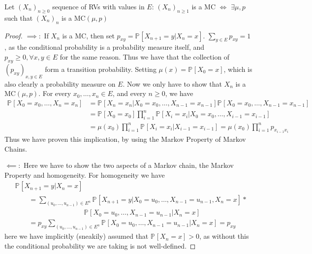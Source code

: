 \begin{prop}
	Let $(X_n)_{n \geq 0}$ sequence of RVs with values in $E$:
	$(X_n)_{n \geq 1}$ is a MC $\iff$ $\exists \mu, p$ such that $(X_n)_n$ is a MC$(\mu, p)$
\end{prop}
\begin{proof}
	$\implies:$ If $X_n$ is a MC, then set $p_{xy}=\mathbb{P}_{} \left[ X_{n+1}=y | X_{n}=x \right] $. $\sum_{y \in E}^{} p_{xy}=1$, as the conditional probability is a probability measure itself, and $p_{xy}\geq 0, \forall x, y \in E$ for the same reason. Thus we have that the collection of $(p_{xy})_{x,y \in E}$ form a transition probability. Setting $\mu(x) = \mathbb{P}_{} \left[ X_0 =x \right] $, which is also clearly a probability measure on $E$. Now we only have to show that $X_{n} $ is a $ \textrm{MC}(\mu, p)$. For every $x_0,\ldots , x_n \in E$, and every $n\geq 0$, we have
\begin{align}
	\mathbb{P}_{} \left[ X_0=x_0, \ldots ,X_n=x_n \right]  
	&= \mathbb{P}_{} \left[ X_n = x_n | X_0=x_0 , \ldots , X_{n-1}=x_{n-1} \right] \mathbb{P}_{} \left[ X_0=x_0 , \ldots , X_{n-1}=x_{n-1} \right] \\
	&= \mathbb{P}_{} \left[ X_0 = x_0 \right] \prod_{i=1}^{n} \mathbb{P}_{} \left[ X_i = x_i | X_0=x_0, \ldots , X_{i-1}=x_{i-1} \right] \\
	&= \mu(x_0) \prod_{i=1}^n \mathbb{P}_{} \left[ X_i = x_i | X_{i-1} = x_{i-1}  \right] = \mu(x_0) \prod_{i=1}^n p_{x_{i-1}x_{i}} 
\end{align}
Thus we have proven this implication, by using the Markov Property of Markov Chains.

$\impliedby:$ Here we have to show the two aspects of a Markov chain, the Markov Property and homogeneity. For homogeneity we have
\begin{align}
&	\mathbb{P}_{} \left[ X_{n+1} = y | X_n =x \right] \\
&\qquad = \sum_{(u_0, \ldots ,u_{n-1}) \in E^n}^{} \mathbb{P}_{} \left[ X_{n+1}=y | X_0=u_0, \ldots ,X_{n-1}=u_{n-1}, X_n =x \right] * \\
& \qquad \qquad \qquad \qquad \qquad  \mathbb{P}_{} \left[ X_0=u_0, \ldots , X_{n-1}=u_{n-1} | X_n = x \right] \\
&\qquad = p_{xy} \sum_{(u_0, \ldots ,u_{n-1})\in E^n}^{} \mathbb{P}_{} \left[ X_0=u_0, \ldots ,X_{n-1}=u_{n-1} | X_n = x \right] = p_{xy}
\end{align}
here we have implicitly (sneakily) assumed that $\mathbb{P}_{} \left[ X_n = x \right] > 0$, as without this the conditional probability we are taking is not well-defined.


\end{proof}
